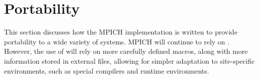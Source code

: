 \documentclass{article}
\begin{document}


\section{Portability}
\label{sec:portability}

This section discusses how the MPICH implementation is written to
provide portability to a wide variety of systems.  MPICH will continue
to rely on .  However, the use of 
will rely on more carefully defined macros, along with more
information stored in external files, allowing for simpler adaptation
to site-specific environments, such as special compilers and runtime
environments. 
\end{document}
